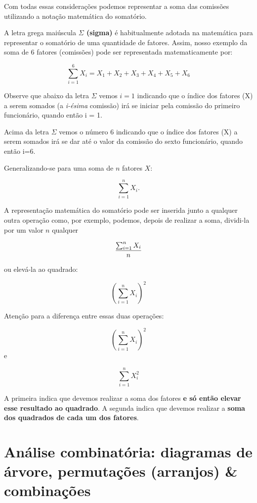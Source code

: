 \documentclass[
]{book}
\begin{document}
Com todas essas considerações podemos representar a soma das comissões utilizando a notação matemática do somatório.

A letra grega maiúscula \textbf{\(\Sigma\) (sigma)} é habitualmente adotada na matemática para representar o somatório de uma quantidade de fatores. Assim, nosso exemplo da soma de 6 fatores (comissões) pode ser representada matematicamente por:

\[
\sum_{i=1}^{6}{X_{i}} = X_{1}+X_{2}+X_{3}+X_{4}+X_{5}+X_{6}
\]

Observe que abaixo da letra \(\Sigma\) vemos \(i=1\) indicando que o índice dos fatores (X) a serem somados (a \emph{i-ésima} comissão) irá se iniciar pela comissão do primeiro funcionário, quando então i = 1.

Acima da letra \(\Sigma\) vemos o número \(6\) indicando que o índice dos fatores (X) a serem somados irá se dar até o valor da comissão do sexto funcionário, quando então i=6.

Generalizando-se para uma soma de \(n\) fatores \(X\):

\[
\sum_{i=1}^n{X_{i}}.
\]

A representação matemática do somatório pode ser inserida junto a qualquer outra operação como, por exemplo, podemos, depois de realizar a soma, dividi-la por um valor \(n\) qualquer

\[
\frac{\sum_{i=1}^n{X_{i}}}{n} \\
\]

ou elevá-la ao quadrado:

\[
\left(\sum_{i=1}^n{X_{i}}\right)^{2}
\]

Atenção para a diferença entre essas duas operações:

\[
\left(\sum_{i=1}^n{X_{i}}\right)^{2}  
\]
e

\[
\sum_{i=1}^n{X_{i}^{2}}
\]

A primeira indica que devemos realizar a soma dos fatores \textbf{e só então elevar esse resultado ao quadrado}. A segunda indica que devemos realizar a \textbf{soma dos quadrados de cada um dos fatores}.

\hypertarget{anuxe1lise-combinatuxf3ria-diagramas-de-uxe1rvore-permutauxe7uxf5es-arranjos-combinauxe7uxf5es}{%
\section{Análise combinatória: diagramas de árvore, permutações (arranjos) \& combinações}\label{anuxe1lise-combinatuxf3ria-diagramas-de-uxe1rvore-permutauxe7uxf5es-arranjos-combinauxe7uxf5es}}
\end{document}
